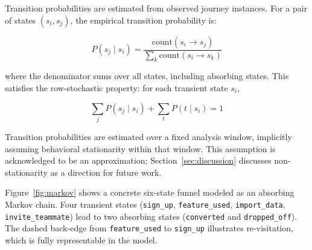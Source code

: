 \documentclass[12pt, a4paper]{article}
\begin{document}
Transition probabilities are estimated from observed journey instances. For a pair of states $(s_i, s_j)$, the empirical transition probability is:

\begin{equation}
  P(s_j \mid s_i) = \frac{\text{count}(s_i \to s_j)}{\sum_k \text{count}(s_i \to s_k)}
  \label{eq:transition}
\end{equation}

where the denominator sums over all states, including absorbing states. This satisfies the row-stochastic property: for each transient state $s_i$,

\begin{equation}
  \sum_j P(s_j \mid s_i) + \sum_t P(t \mid s_i) = 1
  \label{eq:rowstochastic}
\end{equation}

Transition probabilities are estimated over a fixed analysis window, implicitly assuming behavioral stationarity within that window. This assumption is acknowledged to be an approximation; Section~\ref{sec:discussion} discusses non-stationarity as a direction for future work.

Figure~\ref{fig:markov} shows a concrete six-state funnel modeled as an absorbing Markov chain. Four transient states (\texttt{sign\_up}, \texttt{feature\_used}, \texttt{import\_data}, \texttt{invite\_teammate}) lead to two absorbing states (\texttt{converted} and \texttt{dropped\_off}). The dashed back-edge from \texttt{feature\_used} to \texttt{sign\_up} illustrates re-visitation, which is fully representable in the model.
\end{document}
